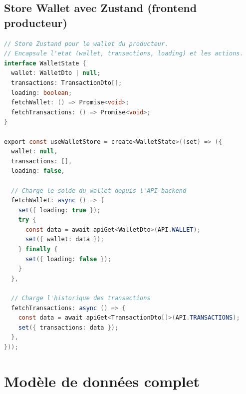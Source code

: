 \documentclass[12pt, a4paper, oneside]{report}
\begin{document}
\section{Store Wallet avec Zustand (frontend producteur)}

\begin{lstlisting}[language=Java, caption={wallet.store.ts -- Gestion d'état avec Zustand},
  label=lst:walletstore]
// Store Zustand pour le wallet du producteur.
// Encapsule l'etat (wallet, transactions, loading) et les actions.
interface WalletState {
  wallet: WalletDto | null;
  transactions: TransactionDto[];
  loading: boolean;
  fetchWallet: () => Promise<void>;
  fetchTransactions: () => Promise<void>;
}

export const useWalletStore = create<WalletState>((set) => ({
  wallet: null,
  transactions: [],
  loading: false,

  // Charge le solde du wallet depuis l'API backend
  fetchWallet: async () => {
    set({ loading: true });
    try {
      const data = await apiGet<WalletDto>(API.WALLET);
      set({ wallet: data });
    } finally {
      set({ loading: false });
    }
  },

  // Charge l'historique des transactions
  fetchTransactions: async () => {
    const data = await apiGet<TransactionDto[]>(API.TRANSACTIONS);
    set({ transactions: data });
  },
}));
\end{lstlisting}

\chapter{Modèle de données complet}
\end{document}
